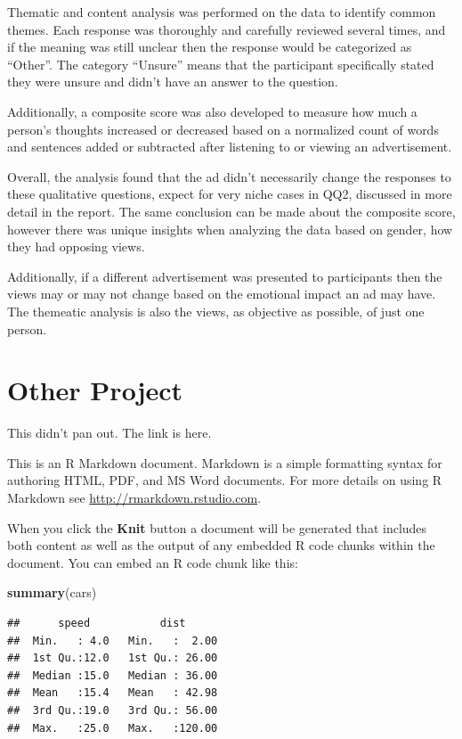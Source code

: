 \documentclass[
]{article}
\newenvironment{Shaded}{\begin{snugshade}}{\end{snugshade}}
\newcommand{\FunctionTok}[1]{\textcolor[rgb]{0.13,0.29,0.53}{\textbf{#1}}}
\newcommand{\NormalTok}[1]{#1}
\begin{document}
Thematic and content analysis was performed on the data to identify
common themes. Each response was thoroughly and carefully reviewed
several times, and if the meaning was still unclear then the response
would be categorized as ``Other''. The category ``Unsure'' means that
the participant specifically stated they were unsure and didn't have an
answer to the question.

Additionally, a composite score was also developed to measure how much a
person's thoughts increased or decreased based on a normalized count of
words and sentences added or subtracted after listening to or viewing an
advertisement.

Overall, the analysis found that the ad didn't necessarily change the
responses to these qualitative questions, expect for very niche cases in
QQ2, discussed in more detail in the report. The same conclusion can be
made about the composite score, however there was unique insights when
analyzing the data based on gender, how they had opposing views.

Additionally, if a different advertisement was presented to participants
then the views may or may not change based on the emotional impact an ad
may have. The themeatic analysis is also the views, as objective as
possible, of just one person.

\section{Other Project}\label{other-project}

This didn't pan out. The link is here.

This is an R Markdown document. Markdown is a simple formatting syntax
for authoring HTML, PDF, and MS Word documents. For more details on
using R Markdown see \url{http://rmarkdown.rstudio.com}.

When you click the \textbf{Knit} button a document will be generated
that includes both content as well as the output of any embedded R code
chunks within the document. You can embed an R code chunk like this:

\begin{Shaded}
\begin{Highlighting}[]
\FunctionTok{summary}\NormalTok{(cars)}
\end{Highlighting}
\end{Shaded}

\begin{verbatim}
##      speed           dist       
##  Min.   : 4.0   Min.   :  2.00  
##  1st Qu.:12.0   1st Qu.: 26.00  
##  Median :15.0   Median : 36.00  
##  Mean   :15.4   Mean   : 42.98  
##  3rd Qu.:19.0   3rd Qu.: 56.00  
##  Max.   :25.0   Max.   :120.00
\end{verbatim}
\end{document}
